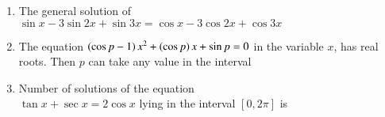 \documentclass[journal,12pt,twocolumn]{IEEEtran}
\theoremstyle{remark}
\begin{document}
\begin{enumerate}
    \item The general solution of \\$\sin{x}-3\sin{2x} + \sin{3x} = \cos{x}-3\cos{2x} + \cos{3x}$
        
        \begin{enumerate}[label={(\alph*)}]
        \end{enumerate}


    \item The equation $\left(\cos{p}-1\right)x^2+\left(\cos{p}\right)x+\sin{p}=0$ in the variable $x$, has real roots. Then $p$ can take any value in the interval
        
        \begin{enumerate}[label={(\alph*)}]

        \end{enumerate}

    \item Number of solutions of the equation \\$\tan{x}+\sec{x} = 2\cos{x}$ lying in the interval $[0, 2\pi]$ is
        

\end{enumerate}
\end{document}
